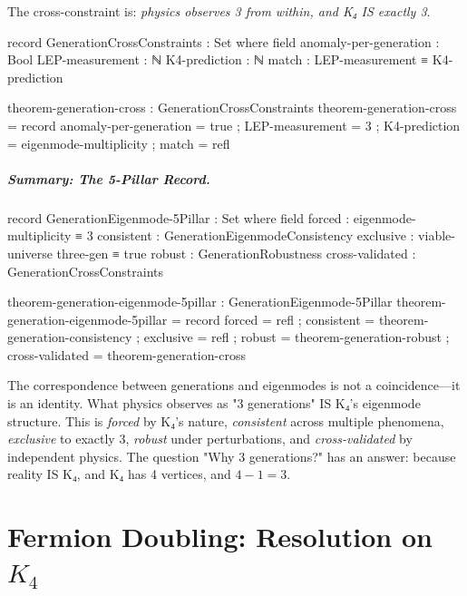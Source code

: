 \documentclass[11pt,a4paper]{book}
\begin{document}
The cross-constraint is: \emph{physics observes 3 from within, and K₄ IS exactly 3}.

\begin{code}
record GenerationCrossConstraints : Set where
  field
    anomaly-per-generation : Bool
    LEP-measurement        : ℕ
    K4-prediction          : ℕ
    match                  : LEP-measurement ≡ K4-prediction

theorem-generation-cross : GenerationCrossConstraints
theorem-generation-cross = record
  { anomaly-per-generation = true
  ; LEP-measurement        = 3
  ; K4-prediction          = eigenmode-multiplicity
  ; match                  = refl
  }
\end{code}

\paragraph{Summary: The 5-Pillar Record.}

\begin{code}
record GenerationEigenmode-5Pillar : Set where
  field
    forced           : eigenmode-multiplicity ≡ 3
    consistent       : GenerationEigenmodeConsistency
    exclusive        : viable-universe three-gen ≡ true
    robust           : GenerationRobustness
    cross-validated  : GenerationCrossConstraints

theorem-generation-eigenmode-5pillar : GenerationEigenmode-5Pillar
theorem-generation-eigenmode-5pillar = record
  { forced          = refl
  ; consistent      = theorem-generation-consistency
  ; exclusive       = refl
  ; robust          = theorem-generation-robust
  ; cross-validated = theorem-generation-cross
  }
\end{code}

The correspondence between generations and eigenmodes is not a coincidence—it is an identity. What physics observes as "3 generations" IS K₄'s eigenmode structure. This is \emph{forced} by K₄'s nature, \emph{consistent} across multiple phenomena, \emph{exclusive} to exactly 3, \emph{robust} under perturbations, and \emph{cross-validated} by independent physics. The question "Why 3 generations?" has an answer: because reality IS K₄, and K₄ has 4 vertices, and $4 - 1 = 3$.


\chapter{Fermion Doubling: Resolution on \texorpdfstring{$K_4$}{K4}}
\label{chap:fermion-doubling}
\end{document}
